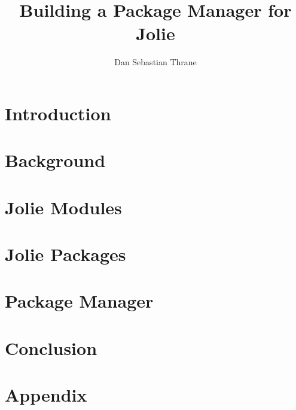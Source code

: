 \documentclass[11pt, a4paper]{report} %
\title{Building a Package Manager for Jolie}
\author{Dan Sebastian Thrane}
\theoremstyle{definition}
\newcommand{\blankpage}{
  \newpage
  \thispagestyle{empty}
  \mbox{}
  \newpage
}
\begin{document}

\tableofcontents

\blankpage

\pagestyle{MyStyle}

\chapter{Introduction}


\chapter{Background}


\chapter{Jolie Modules}


\chapter{Jolie Packages}
\label{cha:packages}


\chapter{Package Manager}
\label{cha:pkg_mngr}


\chapter{Conclusion}
\label{cha:conclusion}


\appendix
\chapter{Appendix}


\printbibliography
\end{document}
